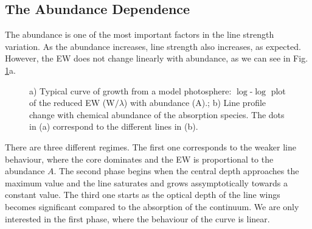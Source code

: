 \documentclass[dvips,12pt,a4paper]{report}
\begin{document}
{\subsection{The Abundance Dependence}
\label{abdep}

The abundance is one of the most important factors in the line strength variation. As the abundance increases, line strength also increases, as expected. However, the EW does not change linearly with abundance, as we can see in Fig. \ref{cog}a.
\begin{figure}[h]
\centering
{}
\caption[EW and Profile dependence of abundance] {a) Typical curve of growth from a model photosphere: $\log$-$\log$ plot of the reduced EW (W$/\lambda$) with abundance (A).; b) Line profile change with chemical abundance of the absorption species. The dots in (a) correspond to the different lines in (b).}
\label{cog}
\end{figure}

There are three different regimes. The first one corresponds to the weaker line behaviour, where the core dominates and the EW is proportional to the abundance $A$. The second phase begins when the central depth approaches the maximum value and the line saturates and grows assymptotically towards a constant value. The third one starts as the optical depth of the line wings becomes significant compared to the absorption of the continuum. We are only interested in the first phase, where the behaviour of the curve is linear.

}
\end{document}
